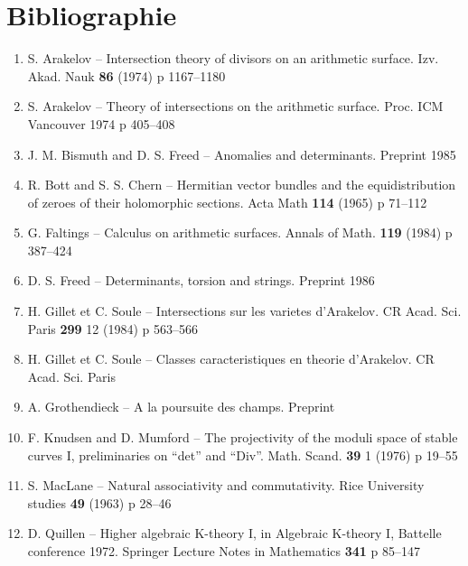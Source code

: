 \documentclass[12pt,a4paper]{article}
\theoremstyle{plain}
\theoremstyle{definition}
\theoremstyle{remark}
\begin{document}
\section*{Bibliographie}

\begin{enumerate}
\item[{[1]}] S. Arakelov -- Intersection theory of divisors on an arithmetic surface. Izv. Akad. Nauk \textbf{86} (1974) p 1167--1180

\item[{[2]}] S. Arakelov -- Theory of intersections on the arithmetic surface. Proc. ICM Vancouver 1974 p 405--408

\item[{[3]}] J. M. Bismuth and D. S. Freed -- Anomalies and determinants. Preprint 1985

\item[{[4]}] R. Bott and S. S. Chern -- Hermitian vector bundles and the equidistribution of zeroes of their holomorphic sections. Acta Math \textbf{114} (1965) p 71--112

\item[{[5]}] G. Faltings -- Calculus on arithmetic surfaces. Annals of Math. \textbf{119} (1984) p 387--424

\item[{[6]}] D. S. Freed -- Determinants, torsion and strings. Preprint 1986

\item[{[7]}] H. Gillet et C. Soule -- Intersections sur les varietes d'Arakelov. CR Acad. Sci. Paris \textbf{299} 12 (1984) p 563--566

\item[{[8]}] H. Gillet et C. Soule -- Classes caracteristiques en theorie d'Arakelov. CR Acad. Sci. Paris

\item[{[9]}] A. Grothendieck -- A la poursuite des champs. Preprint

\item[{[10]}] F. Knudsen and D. Mumford -- The projectivity of the moduli space of stable curves I, preliminaries on ``det'' and ``Div''. Math. Scand. \textbf{39} 1 (1976) p 19--55

\item[{[11]}] S. MacLane -- Natural associativity and commutativity. Rice University studies \textbf{49} (1963) p 28--46

\item[{[12]}] D. Quillen -- Higher algebraic K-theory I, in Algebraic K-theory I, Battelle conference 1972. Springer Lecture Notes in Mathematics \textbf{341} p 85--147


\end{enumerate}
\end{document}
